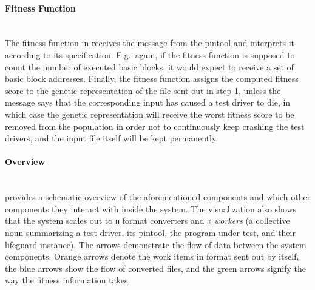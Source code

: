   \paragraph{Fitness Function} ~\\
  The fitness function in \xmlmate receives the message from the pintool and interprets it according to 
  its specification. E.g.\ again, if the fitness function is supposed to count the number of executed basic
  blocks, it would expect to receive a set of basic block addresses. Finally, the  fitness function assigns the
  computed fitness score to the genetic representation of the \xml file sent out in step 1, unless the message
  says that the corresponding input has caused a test driver to die, in which case the genetic representation
  will receive the worst fitness score to be removed from the population in order not to continuously keep
  crashing the test drivers, and the input file itself will be kept permanently.

\paragraph{Overview} ~\\
 provides a schematic overview of the aforementioned components and which other components 
they interact with inside the system. The visualization also shows that the system scales out to \texttt{n}
format converters and \texttt{m} \emph{workers} %
(a collective noun summarizing a test driver, its pintool, the program under test, and their lifeguard
instance).
The arrows demonstrate the flow of data between the system components. Orange arrows denote the work items in
\xml format sent out by \xmlmate itself, the blue arrows show the flow of converted files, and the green
arrows signify the way the fitness information takes.

